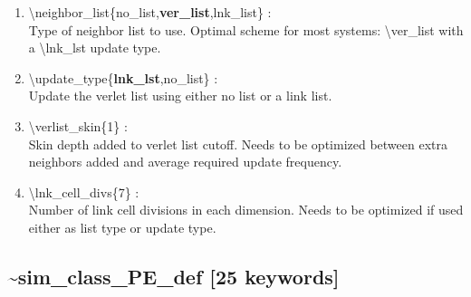 \documentclass[12pt,titlepage]{article}
\begin{document}
\begin{enumerate}

 \vspace{0.15in} 
 \item   \textbackslash neighbor\_list\{no\_list,{\bf ver\_list},lnk\_list\} : \\
   Type of neighbor list to use.  Optimal scheme for most systems: 
   \textbackslash ver\_list with a \textbackslash lnk\_lst update type.

 \vspace{0.15in} 
 \item   \textbackslash update\_type\{{\bf lnk\_lst},no\_list\} : \\
   Update the verlet list using either no list or a link list.

 \vspace{0.15in} 
 \item   \textbackslash verlist\_skin\{1\} : \\
   Skin depth added to verlet list cutoff.  Needs to be optimized between
   extra neighbors added and average required update frequency.

 \vspace{0.15in} 
 \item   \textbackslash lnk\_cell\_divs\{7\} : \\
   Number of link cell divisions in each dimension.  Needs to be optimized
   if used either as list type or update type.

\end{enumerate}

\newpage
\subsection*{\bf \~{}sim\_class\_PE\_def [25 keywords]}
\end{document}
